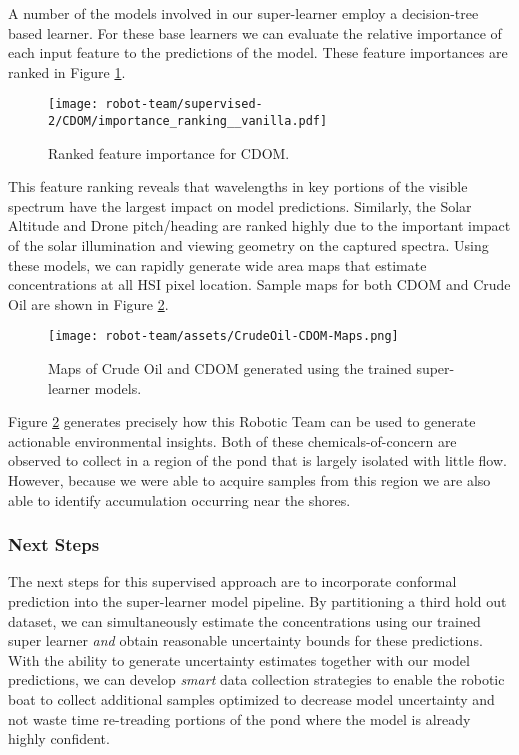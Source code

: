 A number of the models involved in our super-learner employ a decision-tree based learner. For these base learners we can evaluate the relative importance of each input feature to the predictions of the model. These feature importances are ranked in Figure \ref{fig:CDOM-fi}.
\begin{figure}[!hbt]
    \texttt{[image: robot-team/supervised-2/CDOM/importance\_ranking\_\_vanilla.pdf]}
    \caption{Ranked feature importance for CDOM.}
    \label{fig:CDOM-fi}
\end{figure}
This feature ranking reveals that wavelengths in key portions of the visible spectrum have the largest impact on model predictions. Similarly, the Solar Altitude and Drone pitch/heading are ranked highly due to the important impact of the solar illumination and viewing geometry on the captured spectra. Using these models, we can rapidly generate wide area maps that estimate concentrations at all HSI pixel location. Sample maps for both CDOM and Crude Oil are shown in Figure \ref{fig:lary-maps}.

\begin{figure}[!hbt]
  \texttt{[image: robot-team/assets/CrudeOil-CDOM-Maps.png]}
  \caption{Maps of Crude Oil and CDOM generated using the trained super-learner models.}
  \label{fig:lary-maps}
\end{figure}

Figure \ref{fig:lary-maps} generates precisely how this Robotic Team can be used to generate actionable environmental insights. Both of these chemicals-of-concern are observed to collect in a region of the pond that is largely isolated with little flow. However, because we were able to acquire samples from this region we are also able to identify accumulation occurring near the shores.


\subsubsection{Next Steps}

The next steps for this supervised approach are to incorporate conformal prediction into the super-learner model pipeline. By partitioning a third hold out dataset, we can simultaneously estimate the concentrations using our trained super learner \textit{and} obtain reasonable uncertainty bounds for these predictions. With the ability to generate uncertainty estimates together with our model predictions, we can develop \textit{smart} data collection strategies to enable the robotic boat to collect additional samples optimized to decrease model uncertainty and not waste time re-treading portions of the pond where the model is already highly confident.

